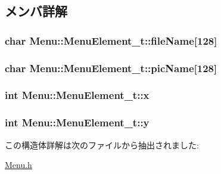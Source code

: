 \subsection{メンバ詳解}
\hypertarget{struct_menu_1_1_menu_element__t_ab24c449e97323b9f4e91d1e8e19db008}{
\subsubsection[{file\+Name}]{\setlength{\rightskip}{0pt plus 5cm}char Menu\+::\+Menu\+Element\+\_\+t\+::file\+Name\mbox{[}128\mbox{]}}}\label{struct_menu_1_1_menu_element__t_ab24c449e97323b9f4e91d1e8e19db008}
\hypertarget{struct_menu_1_1_menu_element__t_aba2866f80e22a37cb7657e5344308b2b}{
\subsubsection[{pic\+Name}]{\setlength{\rightskip}{0pt plus 5cm}char Menu\+::\+Menu\+Element\+\_\+t\+::pic\+Name\mbox{[}128\mbox{]}}}\label{struct_menu_1_1_menu_element__t_aba2866f80e22a37cb7657e5344308b2b}
\hypertarget{struct_menu_1_1_menu_element__t_a32951f293ee164b34c17d78f430ff4df}{
\subsubsection[{x}]{\setlength{\rightskip}{0pt plus 5cm}int Menu\+::\+Menu\+Element\+\_\+t\+::x}}\label{struct_menu_1_1_menu_element__t_a32951f293ee164b34c17d78f430ff4df}
\hypertarget{struct_menu_1_1_menu_element__t_a2d2fd0d65e8c8d9bdbf43bd9647b99c9}{
\subsubsection[{y}]{\setlength{\rightskip}{0pt plus 5cm}int Menu\+::\+Menu\+Element\+\_\+t\+::y}}\label{struct_menu_1_1_menu_element__t_a2d2fd0d65e8c8d9bdbf43bd9647b99c9}


この構造体詳解は次のファイルから抽出されました\+:\begin{DoxyCompactItemize}
\item 
\hyperlink{_menu_8h}{Menu.\+h}\end{DoxyCompactItemize}
